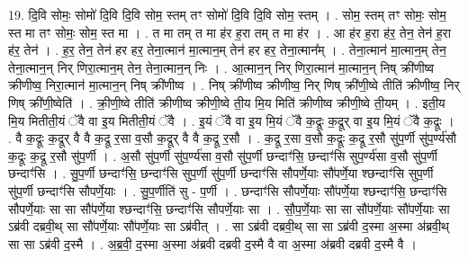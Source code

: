 \documentclass[17pt]{extarticle}
\begin{document}
19. दि॒वि सोमः॒ सोमो॑ दि॒वि दि॒वि सोम॒ स्तम् तꣳ सोमो॑ दि॒वि दि॒वि सोम॒ स्तम् । . सोम॒ स्तम् तꣳ सोमः॒ सोम॒ स्त मा तꣳ सोमः॒ सोम॒ स्त मा । . त मा तम् त मा ह॑र ह॒रा तम् त मा ह॑र । . आ ह॑र ह॒रा ह॑र॒ तेन॒ तेन॑ ह॒रा ह॑र॒ तेन॑ । . ह॒र॒ तेन॒ तेन॑ हर हर॒ तेना॒त्मान॑ मा॒त्मान॒म् तेन॑ हर हर॒ तेना॒त्मान᳚म् । . तेना॒त्मान॑ मा॒त्मान॒म् तेन॒ तेना॒त्मान॒न् निर् णिरा॒त्मान॒म् तेन॒ तेना॒त्मान॒न् निः । . आ॒त्मान॒न् निर् णिरा॒त्मान॑ मा॒त्मान॒न् निष् क्री॑णीष्व क्रीणीष्व॒ निरा॒त्मान॑ मा॒त्मान॒न् निष् क्री॑णीष्व । . निष् क्री॑णीष्व क्रीणीष्व॒ निर् णिष् क्री॑णी॒ष्वे तीति॑ क्रीणीष्व॒ निर् णिष् क्री॑णी॒ष्वेति॑ । . क्री॒णी॒ष्वे तीति॑ क्रीणीष्व क्रीणी॒ष्वे ती॒य मि॒य मिति॑ क्रीणीष्व क्रीणी॒ष्वे ती॒यम् । . इती॒य मि॒य मितीती॒यं ॅवै वा इ॒य मितीती॒यं ॅवै । . इ॒यं ॅवै वा इ॒य मि॒यं ॅवै क॒द्रूः क॒द्रूर् वा इ॒य मि॒यं ॅवै क॒द्रूः । . वै क॒द्रूः क॒द्रूर् वै वै क॒द्रू र॒सा व॒सौ क॒द्रूर् वै वै क॒द्रू र॒सौ । . क॒द्रू र॒सा व॒सौ क॒द्रूः क॒द्रू र॒सौ सु॑प॒र्णी सु॑प॒र्ण्य॑सौ क॒द्रूः क॒द्रू र॒सौ सु॑प॒र्णी । . अ॒सौ सु॑प॒र्णी सु॑प॒र्ण्य॑सा व॒सौ सु॑प॒र्णी छन्दाꣳ॑सि॒ छन्दाꣳ॑सि सुप॒र्ण्य॑सा व॒सौ सु॑प॒र्णी छन्दाꣳ॑सि । . सु॒प॒र्णी छन्दाꣳ॑सि॒ छन्दाꣳ॑सि सुप॒र्णी सु॑प॒र्णी छन्दाꣳ॑सि सौपर्णे॒याः सौ॑पर्णे॒या श्छन्दाꣳ॑सि सुप॒र्णी सु॑प॒र्णी छन्दाꣳ॑सि सौपर्णे॒याः । . सु॒प॒र्णीति॑ सु - प॒र्णी । . छन्दाꣳ॑सि सौपर्णे॒याः सौ॑पर्णे॒या श्छन्दाꣳ॑सि॒ छन्दाꣳ॑सि सौपर्णे॒याः सा सा सौ॑पर्णे॒या श्छन्दाꣳ॑सि॒ छन्दाꣳ॑सि सौपर्णे॒याः सा । . सौ॒प॒र्णे॒याः सा सा सौ॑पर्णे॒याः सौ॑पर्णे॒याः सा ऽब्र॑वी दब्रवी॒थ् सा सौ॑पर्णे॒याः सौ॑पर्णे॒याः सा ऽब्र॑वीत् । . सा ऽब्र॑वी दब्रवी॒थ् सा सा ऽब्र॑वी द॒स्मा अ॒स्मा अ॑ब्रवी॒थ् सा सा ऽब्र॑वी द॒स्मै । . अ॒ब्र॒वी॒ द॒स्मा अ॒स्मा अ॑ब्रवी दब्रवी द॒स्मै वै वा अ॒स्मा अ॑ब्रवी दब्रवी द॒स्मै वै । \newline
\end{document}
